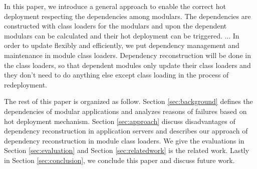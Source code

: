 \documentclass[conference]{IEEEtran}
\begin{document}
In this paper, we introduce a general approach to enable the correct hot deployment respecting the dependencies among modulars. The dependencies are constructed with  class loaders for the modulars and upon the dependent modulars can be calculated and  their hot deployment can be triggered. ... In order to update flexibly and efficiently, we put dependency management and maintenance in module class loaders. Dependency reconstruction will be done in the class loaders, so that dependent modules only update their class loaders and they don't need to do anything else except class loading in the process of redeployment.







The rest of this paper is organized as follow. 
Section \ref{sec:background} defines the dependencies of modular applications and analyzes reasons of failures based on hot deployment mechanism. 
Section \ref{sec:approach} discuss disadvantages of dependency reconstruction in application servers and describes our approach of dependency reconstruction in module class loaders.
We give the evaluations in Section \ref{sec:evaluation} and Section \ref{sec:relatedwork} is the related work.
Lastly in Section \ref{sec:conclusion}, we conclude this paper and discuss future work.
\end{document}

